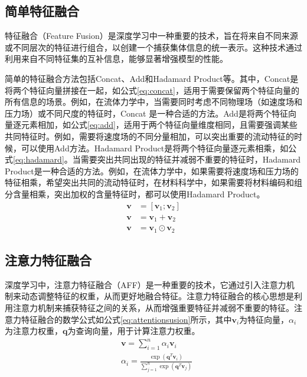 \subsection{简单特征融合}
特征融合（Feature Fusion）是深度学习中一种重要的技术，旨在将来自不同来源或不同层次的特征进行组合，以创建一个捕获集体信息的统一表示。这种技术通过利用来自不同特征集的互补信息，能够显著增强模型的性能。

简单的特征融合方法包括Concat、Add和Hadamard Product等。其中，Concat是将两个特征向量拼接在一起，如公式\eqref{eq:concat}，适用于需要保留两个特征向量的所有信息的场景。例如，在流体力学中，当需要同时考虑不同物理场（如速度场和压力场）或不同尺度的特征时，Concat 是一种合适的方法。Add是将两个特征向量逐元素相加，如公式\eqref{eq:add}，适用于两个特征向量维度相同，且需要强调某些共同特征时。例如，需要将速度场的不同分量相加，可以突出重要的流动特征的时候，可以使用Add方法。Hadamard Product是将两个特征向量逐元素相乘，如公式\eqref{eq:hadamard}。当需要突出共同出现的特征并减弱不重要的特征时，Hadamard Product是一种合适的方法。例如，在流体力学中，如果需要将速度场和压力场的特征相乘，希望突出共同的流动特征时，在材料科学中，如果需要将材料编码和组分含量相乘，突出加权的含量特征时，都可以使用Hadamard Product。
\begin{align}
  \mathbf{v} & = [\mathbf{v}_1; \mathbf{v}_2] \label{eq:concat}          \\
  \mathbf{v} & = \mathbf{v}_1 + \mathbf{v}_2    \label{eq:add}           \\
  \mathbf{v} & = \mathbf{v}_1 \odot \mathbf{v}_2     \label{eq:hadamard}
\end{align}
\subsection{注意力特征融合}
深度学习中，注意力特征融合（AFF）是一种重要的技术，它通过引入注意力机制来动态调整特征的权重，从而更好地融合特征\cite{dai2021attentional}。注意力特征融合的核心思想是利用注意力机制来捕获特征之间的关系，从而增强重要特征并减弱不重要的特征。注意力特征融合的数学公式如公式\eqref{eq:attentionsusion}所示，其中$\mathbf{v}_i$为特征向量，$\alpha_i$为注意力权重，$\mathbf{q}$为查询向量，用于计算注意力权重。
\begin{equation}
  \begin{aligned}
     & \mathbf{v} = \sum_{i=1}^{n} \alpha_i \mathbf{v}_i                                                 \\
     & \alpha_i = \frac{\exp(\mathbf{q}^T \mathbf{v}_i)}{\sum_{j=1}^{n} \exp(\mathbf{q}^T \mathbf{v}_j)}
  \end{aligned}   \label{eq:attentionsusion}
\end{equation}

